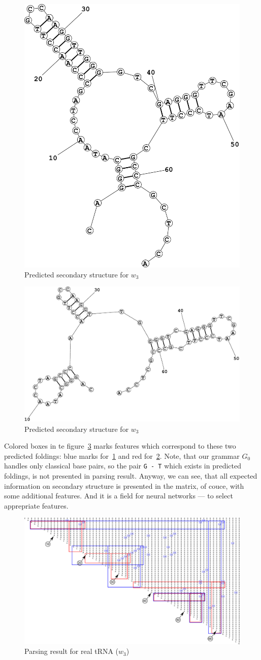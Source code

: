 \documentclass[a4paper,twoside]{article}
\begin{document}
\begin{figure}
\centering
\includegraphics[width=.45\textwidth]{figures/Fold1.pdf}
\caption{Predicted secondary structure for $w_3$}
\label{fig:real-trna-folding1}
\end{figure}


\begin{figure}
\centering
\includegraphics[width=.45\textwidth]{figures/Fold2.pdf}
\caption{Predicted secondary structure for $w_3$}
\label{fig:real-trna-folding2}
\end{figure}

Colored boxes in te figure~\ref{fig:real-trna} marks features which correspond to these two predicted foldings: blue marks for~\ref{fig:real-trna-folding1} and red for~\ref{fig:real-trna-folding2}.
Note, that our grammar $G_0$ handles only classical base pairs, so the pair \verb|G - T| which exists in predicted foldings, is not presented in parsing result.
Anyway, we can see, that all expected information on secondary structure is presented in the matrix, of couce, with some additional features.
And it is a field for neural networks --- to select apprepriate features.

\begin{figure}
\centering
\includegraphics[width=.98\textwidth]{figures/0m.pdf}
\caption{Parsing result for real tRNA ($w_3$)}
\label{fig:real-trna}
\end{figure}
\end{document}
